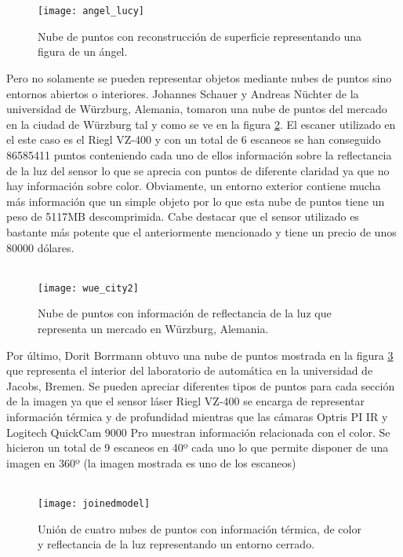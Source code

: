 \\
\\
\begin{figure}
\centering
\texttt{[image: angel\_lucy]}
\caption{Nube de puntos con reconstrucción de superficie representando una figura de un ángel.}\label{fig:angel_lucy}
\end{figure}
Pero no solamente se pueden representar objetos mediante nubes de puntos sino entornos abiertos o interiores. Johannes Schauer y Andreas Nüchter de la universidad de Würzburg, Alemania, tomaron una nube de puntos\cite{pcd_exteriores} del mercado en la ciudad de Würzburg tal y como se ve en la figura \ref{fig:wue_city}.
El escaner utilizado en el este caso es el Riegl VZ-400\cite{escaner_riegl} y con un total de 6 escaneos se han conseguido 86585411 puntos conteniendo cada uno de ellos información sobre la reflectancia de la luz del sensor lo que se aprecia con puntos de diferente claridad ya que no hay información sobre color. Obviamente, un entorno exterior contiene mucha más información que un simple objeto por lo que esta nube de puntos tiene un peso de 5117MB descomprimida. Cabe destacar que el sensor utilizado es bastante más potente que el anteriormente mencionado y tiene un precio de unos 80000 dólares.
\\
\\
\begin{figure}
\centering
\texttt{[image: wue\_city2]}
\caption{Nube de puntos con información de reflectancia de la luz que representa un mercado en Würzburg, Alemania.}\label{fig:wue_city}
\end{figure}
Por último, Dorit Borrmann obtuvo una nube de puntos\cite{pcd_exteriores} mostrada en la figura \ref{fig:joined_model} que representa el interior del laboratorio de automática en la universidad de Jacobs, Bremen. Se pueden apreciar diferentes tipos de puntos para cada sección de la imagen ya que el sensor láser Riegl VZ-400 se encarga de representar información térmica y de profundidad mientras que las cámaras Optris PI IR y Logitech QuickCam 9000 Pro muestran información relacionada con el color. Se hicieron un total de 9 escaneos en 40º cada uno lo que permite disponer de una imagen en 360º (la imagen mostrada es uno de los escaneos)
\\
\\
\begin{figure}
\centering
\texttt{[image: joinedmodel]}
\caption{Unión de cuatro nubes de puntos con información térmica, de color y reflectancia de la luz representando un entorno cerrado.}\label{fig:joined_model}
\end{figure}


